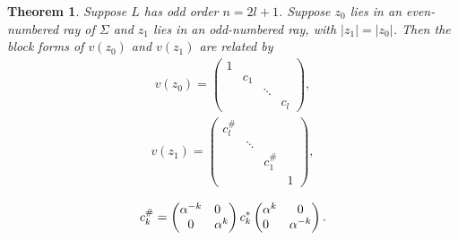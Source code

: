 \documentclass{surv-l}
\theoremstyle{plain}
\newtheorem{theorem}{Theorem}[section]
\theoremstyle{definition}
\numberwithin{equation}{chapter}
\begin{document}
\begin{theorem}\label{them16.13}
Suppose $L$  has odd order $n=2l+1$.  Suppose $z_{0}$ lies in an even-numbered ray of $\Sigma$ and $z_{1}$ lies in an odd-numbered ray, with $|z_{1}|=|z_{0}|$. Then the block forms of $v(z_{0})$ and $v(z_{1})$ are related by
\setcounter{equation}{13}
\begin{align}\label{eq16.14}
v(z_{0})=\left(\begin{array}{llll}
{1}&&&\\
&c_{1}&& \\
& & \ddots&\\
& & & c_{l}\end{array}\right),
\end{align}
\begin{align}\label{eq16.15}
v(z_{1})=\left(\begin{array}{llll}
{c_{l}^{\#}}&&&\\
&\ddots&& \\
& &{c_{1}^{\#}}&\\
& & & 1\end{array}\right),
\end{align}

\begin{align}\label{eq16.16}
c_{k}^{\#}=\left(\begin{array}{@{}cl@{}}
\alpha^{-k} & 0\\
0 & \alpha^{k}
\end{array}\right) c_{k}^{*} \left(\begin{array}{@{}lc@{}}
\alpha^{k} & 0\\
0 & \alpha^{-k}
\end{array}\right).
\end{align}


\end{theorem}
\end{document}
